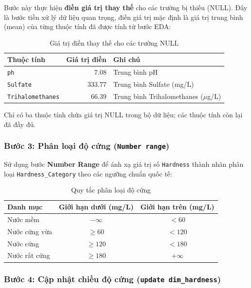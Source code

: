 Bước này thực hiện \textbf{điền giá trị thay thế} cho các trường bị thiếu (NULL). Đây là bước tiền xử lý dữ liệu quan trọng, điền giá trị mặc định là giá trị trung bình (mean) của từng thuộc tính đã được tính từ bước EDA:

\begin{table}[H]
\centering
\caption{Giá trị điền thay thế cho các trường NULL}
\label{tab:null_replacement}
\begin{tabular}{lrl}
\hline
\textbf{Thuộc tính} & \textbf{Giá trị điền} & \textbf{Ghi chú} \\
\hline
\texttt{ph} & 7.08 & Trung bình pH \\
\texttt{Sulfate} & 333.77 & Trung bình Sulfate (mg/L) \\
\texttt{Trihalomethanes} & 66.39 & Trung bình Trihalomethanes ($\mu$g/L) \\
\hline
\end{tabular}
\end{table}

Chỉ có ba thuộc tính chứa giá trị NULL trong bộ dữ liệu; các thuộc tính còn lại đã đầy đủ.

\subsubsection{Bước 3: Phân loại độ cứng (\texttt{Number range})}

Sử dụng bước \textbf{Number Range} để ánh xạ giá trị số \texttt{Hardness} thành nhãn phân loại \texttt{Hardness\_Category} theo các ngưỡng chuẩn quốc tế:

\begin{table}[H]
\centering
\caption{Quy tắc phân loại độ cứng}
\label{tab:hardness_range}
\begin{tabular}{lcc}
\hline
\textbf{Danh mục} & \textbf{Giới hạn dưới (mg/L)} & \textbf{Giới hạn trên (mg/L)} \\
\hline
Nước mềm & $-\infty$ & $< 60$ \\
Nước cứng vừa & $\geq 60$ & $< 120$ \\
Nước cứng & $\geq 120$ & $< 180$ \\
Nước rất cứng & $\geq 180$ & $+\infty$ \\
\hline
\end{tabular}
\end{table}

\subsubsection{Bước 4: Cập nhật chiều độ cứng (\texttt{update dim\_hardness})}

